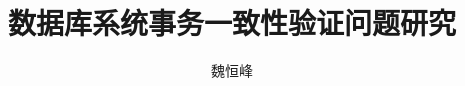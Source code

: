 \documentclass[]{beamer}
\title[]{数据库系统事务一致性验证问题研究}
\subtitle{\teal{(工业软件产教联合主题交流会)}}
\author[魏恒峰]{魏恒峰}
\institute{hfwei@nju.edu.cn}
\date{\zhtoday}
\begin{document}
\maketitle



\thankyou{}
\end{document}
